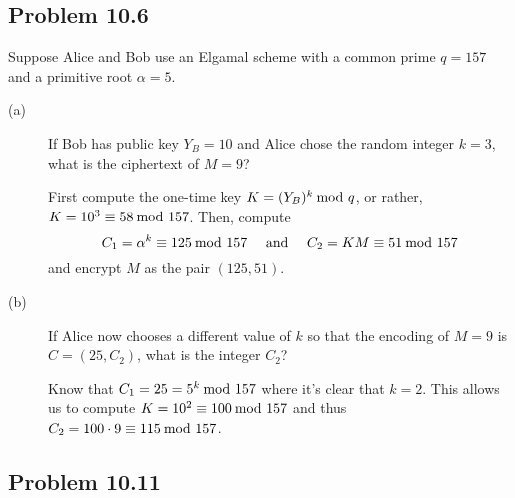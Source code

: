 \documentclass[../hw_sols.tex]{subfiles}
\begin{document}

\subsection*{Problem 10.6}

Suppose Alice and Bob use an Elgamal scheme with a common prime $q = 157$ and 
a primitive root $\alpha = 5$.

\begin{description}

\item[(a)] If Bob has public key $Y_B = 10$ and Alice chose the random 
integer $k = 3$, what is the ciphertext of $M = 9$?

\begin{solution}
First compute the one-time key $K = (Y_B)^k \tmod{q}$, or rather, 
$K = 10^3 \equiv 58 \tmod{157}$. Then, compute
	\[ C_1 = \alpha^k \equiv 125 \tmod{157} 
	\quad \text{ and } \quad
	C_2 = KM \equiv 51 \tmod{157} \]
and encrypt $M$ as the pair $(125, 51)$.
\end{solution}

\item[(b)] If Alice now chooses a different value of $k$ so that the encoding 
of $M = 9$ is $C = (25, C_2)$, what is the integer $C_2$?

\begin{solution}
Know that $C_1 = 25 = 5^k \tmod{157}$ where it's clear that $k = 2$. This 
allows us to compute \newline
$K = 10^2 \equiv 100 \tmod{157}$ and thus 
$C_2 = 100 \cdot 9 \equiv 115 \tmod{157}$.
\end{solution}

\end{description}


\newpage


\subsection*{Problem 10.11}
\end{document}
